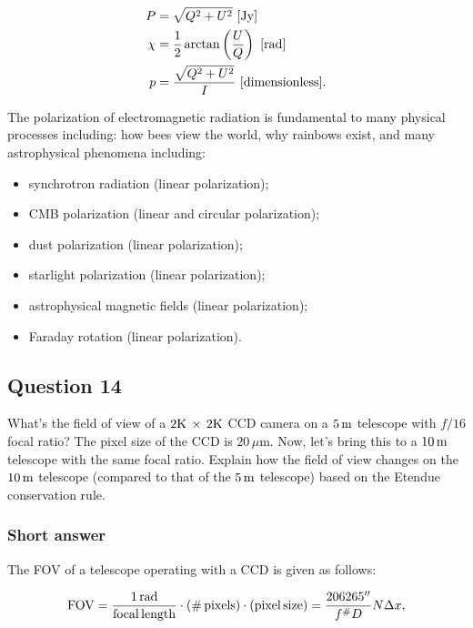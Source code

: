 \documentclass[a4paper,10pt]{article}
\begin{document}
\begin{align*}
    P &= \sqrt{Q^2+U^2} ~ [{\rm Jy}] \\
    \chi &= \frac{1}{2} \arctan \left(\frac{U}{Q}\right) ~ [{\rm rad}] \\
    p &= \frac{\sqrt{Q^2+U^2}}{I} ~ [{\rm dimensionless}].
\end{align*}

The polarization of electromagnetic radiation is fundamental to many physical processes including: how bees view the world, why rainbows exist, and many astrophysical phenomena including:

\begin{itemize}
    \item synchrotron radiation (linear polarization);
    \item CMB polarization (linear and circular polarization);
    \item dust polarization (linear polarization);
    \item starlight polarization (linear polarization);
    \item astrophysical magnetic fields (linear polarization);
    \item Faraday rotation (linear polarization).
\end{itemize}



\newpage
\subsection{Question 14}

What's the field of view of a $2{\rm K}\,\times\,2{\rm K}$ CCD camera on a $5\,{\rm m}$ telescope with $f/16$ focal ratio? The pixel size of the CCD is $20\,\mu$m. Now, let’s bring this to a $10\,{\rm m}$ telescope with the same focal ratio. Explain how the field of view changes on the $10\,{\rm m}$ telescope (compared to that of the $5\,{\rm m}$ telescope) based on the Etendue conservation rule.

\subsubsection{Short answer}

The FOV of a telescope operating with a CCD is given as follows:

\begin{align*}
    {\rm FOV} = \frac{1\,{\rm rad}}{\rm focal\,length} \cdot (\#\,{\rm pixels}) \cdot ({\rm pixel\,size}) = \frac{206265''}{f^{\#}D}N\Delta x,
\end{align*}
\end{document}
